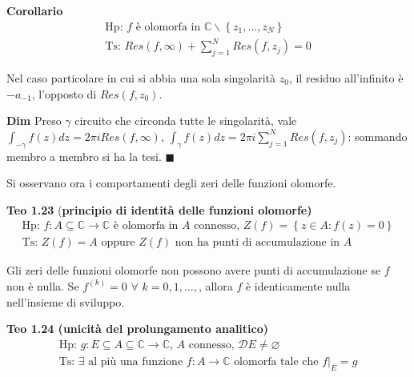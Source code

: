 \documentclass{article}
\begin{document}
\textbf{Corollario}%
\begin{gather*}
\text{Hp: }f\text{ \`{e} olomorfa in }%
\mathbb{C}
\backslash \left\{ z_{1},...,z_{N}\right\} \\
\text{Ts: }Res\left( f,\infty \right) +\sum_{j=1}^{N}Res\left(
f,z_{j}\right) =0
\end{gather*}

Nel caso particolare in cui si abbia una sola singolarit\`{a} $z_{0}$, il
residuo all'infinito \`{e} $-a_{-1}$, l'opposto di $Res\left( f,z_{0}\right) 
$.

\textbf{Dim} Preso $\gamma $ circuito che circonda tutte le singolarit\`{a},
vale $\int_{-\gamma }f\left( z\right) dz=2\pi iRes\left( f,\infty \right) $, 
$\int_{\gamma }f\left( z\right) dz=2\pi i\sum_{j=1}^{N}Res\left(
f,z_{j}\right) $: sommando membro a membro si ha la tesi. $\blacksquare $

Si osservano ora i comportamenti degli zeri delle funzioni olomorfe.

\textbf{Teo 1.23} (\textbf{principio di identit\`{a} delle funzioni olomorfe)%
}%
\begin{gather*}
\text{Hp: }f:A\subseteq 
\mathbb{C}
\rightarrow 
\mathbb{C}
\text{ \`{e} olomorfa in }A\text{ connesso, }Z\left( f\right) =\left\{ z\in
A:f\left( z\right) =0\right\} \\
\text{Ts: }Z\left( f\right) =A\text{ oppure }Z\left( f\right) \text{ non ha
punti di accumulazione in }A
\end{gather*}

Gli zeri delle funzioni olomorfe non possono avere punti di accumulazione se 
$f$ non \`{e} nulla. Se $f^{\left( k\right) }=0$ $\forall $ $k=0,1,...,$,
allora $f$ \`{e} identicamente nulla nell'insieme di sviluppo.

\textbf{Teo 1.24 (unicit\`{a} del prolungamento analitico)}%
\begin{gather*}
\text{Hp: }g:E\subseteq A\subseteq 
\mathbb{C}
\rightarrow 
\mathbb{C}
\text{, }A\text{ connesso, }\mathcal{D}E\neq \varnothing \\
\text{Ts: }\exists \text{ al pi\`{u} una funzione }f:A\rightarrow 
\mathbb{C}
\text{ olomorfa tale che }f|_{E}=g
\end{gather*}
\end{document}
